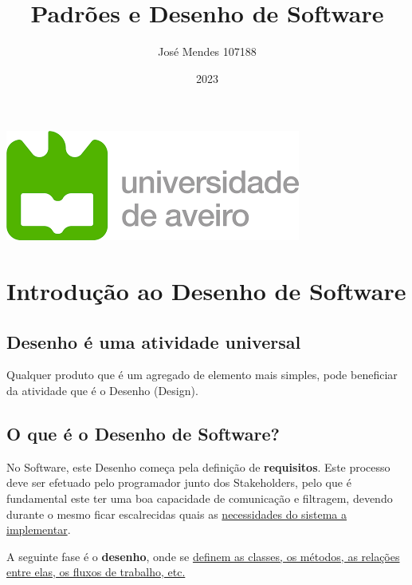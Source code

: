 \documentclass{article}
\title{Padrões e Desenho de Software}
\author{José Mendes 107188}
\date{2023}
\begin{document}
\begin{titlepage}
    \maketitle
    \begin{center}
        \includegraphics[scale=0.4]{UA.png}
    \end{center}
    \thispagestyle{empty} %
\end{titlepage}

\pagebreak

\section{Introdução ao Desenho de Software}

\subsection{Desenho é uma atividade universal}

\par
Qualquer produto que é um agregado de elemento mais simples,
pode beneficiar da atividade que é o Desenho (Design).

\subsection{O que é o Desenho de Software?}

\par
No Software, este Desenho começa pela definição de \textbf{requisitos}.
Este processo deve ser efetuado pelo programador junto dos Stakeholders,
pelo que é fundamental este ter uma boa capacidade de comunicação e filtragem,
devendo durante o mesmo ficar escalrecidas quais as \uline{necessidades
do sistema a implementar}.

\vspace{2mm}
\par
A seguinte fase é o \textbf{desenho}, onde se \uline{definem as classes,
os métodos, as relações entre elas, os fluxos de trabalho, etc.}
\end{document}
